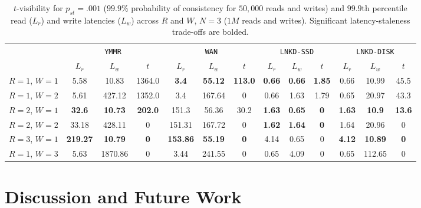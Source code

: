 \documentclass{vldb}
\newcommand{\sectionskip}{-0em}
\begin{document}
\begin{table}
\centering
\begin{tabular}{c|c|c|c|c|c|c|c|c|c|c|c|c|}
\cline{2-13}
& \multicolumn{3}{|c|}{\texttt{YMMR}} & \multicolumn{3}{|c|}{\texttt{WAN}} & \multicolumn{3}{|c|}{\texttt{LNKD-SSD}} & \multicolumn{3}{|c|}{\texttt{LNKD-DISK}}\\
&\multicolumn{1}{|c}{$L_r$}  & \multicolumn{1}{c}{$L_w$} & \multicolumn{1}{c|}{$t$} &  \multicolumn{1}{|c}{$L_r$} & \multicolumn{1}{c}{$L_w$} & \multicolumn{1}{c|}{$t$} &  \multicolumn{1}{|c}{$L_r$} & \multicolumn{1}{c}{$L_w$} & \multicolumn{1}{c|}{$t$} &  \multicolumn{1}{|c}{$L_r$} & \multicolumn{1}{c}{$L_w$} & \multicolumn{1}{c|}{$t$} \\\hline
\multicolumn{1}{|c|}{$R$$=$$1$, $W$$=$$1$}
& 5.58 & 10.83 & 1364.0 & \textbf{3.4} & \textbf{55.12} & \textbf{113.0} & \textbf{0.66} & \textbf{0.66} & \textbf{1.85} & 0.66 & 10.99 & 45.5 \\
\multicolumn{1}{|c|}{$R$$=$$1$, $W$$=$$2$}
& 5.61 & 427.12 & 1352.0 & 3.4 & 167.64 & 0 & 0.66 & 1.63 & 1.79 & 0.65 & 20.97 & 43.3 \\
\multicolumn{1}{|c|}{$R$$=$$2$, $W$$=$$1$}
& \textbf{32.6} & \textbf{10.73} & \textbf{202.0} & 151.3 & 56.36 & 30.2 & \textbf{1.63} & \textbf{0.65} & \textbf{0} & \textbf{1.63} & \textbf{10.9} & \textbf{13.6} \\
\multicolumn{1}{|c|}{$R$$=$$2$, $W$$=$$2$}
& 33.18 & 428.11 & 0 & 151.31 & 167.72 & 0 & \textbf{1.62} & \textbf{1.64} & \textbf{0} & 1.64 & 20.96 & 0 \\
\multicolumn{1}{|c|}{$R$$=$$3$, $W$$=$$1$}
& \textbf{219.27} & \textbf{10.79} & \textbf{0} & \textbf{153.86} & \textbf{55.19} & \textbf{0} & 4.14 & 0.65 & 0 & \textbf{4.12} & \textbf{10.89} & \textbf{0} \\
\multicolumn{1}{|c|}{$R$$=$$1$, $W$$=$$3$}
& 5.63 & 1870.86 & 0 & 3.44 & 241.55 & 0 & 0.65 & 4.09 & 0 & 0.65 & 112.65 & 0 \\
\hline
\end{tabular}
\vspace{-4pt}
\caption{$t$-visibility for $p_{st} = .001$ ($99.9\%$ probability
  of consistency for $50,000$ reads and writes) and $99.9$th percentile read
  ($L_r$) and write latencies ($L_w$) across $R$ and $W$, $N$$=$$3$
  ($1M$ reads and writes). Significant latency-staleness trade-offs are bolded.}
\vspace{-12pt}
\label{table:lat-stale}
\end{table}

\vspace{\sectionskip}\section{Discussion and Future Work}
\label{sec:discussion}
\end{document}

